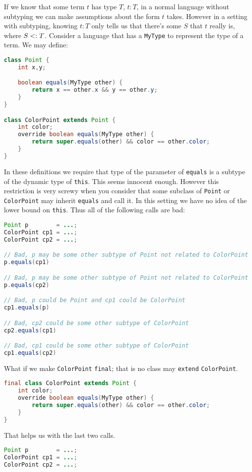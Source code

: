 \documentclass{article}
\begin{document}
\begin{example}
  If we know that some term $t$ has type $T$, $t : T$, in a normal language without subtyping we can make assumptions about the form $t$ takes.
  However in a setting with subtyping, knowing $t : T$ only tells us that there's some $S$ that $t$ really is, where $S <: T$.
  Consider a language that has a \texttt{MyType} to represent the \dynamic{} type of a term.
  We may define:
\begin{lstlisting}[language=Java, escapechar=|]
class Point {
    int x,y;

    boolean equals(MyType other) {
        return x == other.x && y == other.y;
    }
}

class ColorPoint extends Point {
    int color;
    override boolean equals(MyType other) {
        return super.equals(other) && color == other.color;
    }
}
\end{lstlisting}
  In these definitions we require that \dynamic{} type of the parameter of \texttt{equals} is a subtype of the dynamic type of \texttt{this}.
  This seems innocent enough.
  However this restriction is very screwy when you consider that some subclass of \texttt{Point} or \texttt{ColorPoint} may inherit \texttt{equals} and call it.
  In this setting we have no idea of the lower bound on \texttt{this}.
  Thus all of the following calls are bad:
\begin{lstlisting}[language=Java, escapechar=|]
Point p        = ...;
ColorPoint cp1 = ...;
ColorPoint cp2 = ...;

// Bad, p may be some other subtype of Point not related to ColorPoint
p.equals(cp1)

// Bad, p may be some other subtype of Point not related to ColorPoint
p.equals(cp2)

// Bad, p could be Point and cp1 could be ColorPoint
cp1.equals(p)

// Bad, cp2 could be some other subtype of ColorPoint
cp2.equals(cp1)

// Bad, cp1 could be some other subtype of ColorPoint
cp1.equals(cp2) 
\end{lstlisting}
  What if we make \texttt{ColorPoint} \texttt{final}; that is no class may \texttt{extend} \texttt{ColorPoint}.
\begin{lstlisting}[language=Java, escapechar=|]
final class ColorPoint extends Point {
    int color;
    override boolean equals(MyType other) {
        return super.equals(other) && color == other.color;
    }
}
\end{lstlisting}
  That helps us with the last two calls.
\begin{lstlisting}[language=Java, escapechar=|]
Point p        = ...;
ColorPoint cp1 = ...;
ColorPoint cp2 = ...;


\end{lstlisting}
\end{example}
\end{document}
